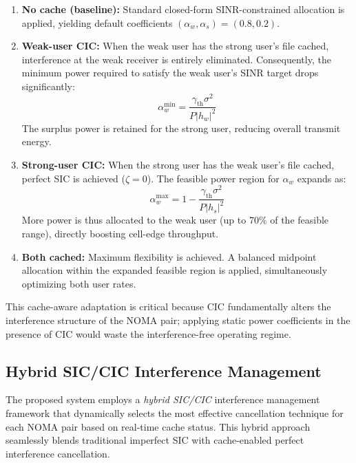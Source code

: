 \documentclass[conference]{IEEEtran}
\begin{document}
\begin{enumerate}
\item \textbf{No cache (baseline):} Standard closed-form SINR-constrained allocation is applied, yielding default coefficients $(\alpha_w, \alpha_s) = (0.8, 0.2)$.

\item \textbf{Weak-user CIC:} When the weak user has the strong user's file cached, interference at the weak receiver is entirely eliminated. Consequently, the minimum power required to satisfy the weak user's SINR target drops significantly:
\begin{equation}
\alpha_w^{\min} = \frac{\gamma_{\text{th}} \sigma^2}{P |h_w|^2}
\label{eq:pw_cic}
\end{equation}
The surplus power is retained for the strong user, reducing overall transmit energy.

\item \textbf{Strong-user CIC:} When the strong user has the weak user's file cached, perfect SIC is achieved ($\zeta = 0$). The feasible power region for $\alpha_w$ expands as:
\begin{equation}
\alpha_w^{\max} = 1 - \frac{\gamma_{\text{th}} \sigma^2}{P |h_s|^2}
\label{eq:pw_psic}
\end{equation}
More power is thus allocated to the weak user (up to 70\% of the feasible range), directly boosting cell-edge throughput.

\item \textbf{Both cached:} Maximum flexibility is achieved. A balanced midpoint allocation within the expanded feasible region is applied, simultaneously optimizing both user rates.
\end{enumerate}

This cache-aware adaptation is critical because CIC fundamentally alters the interference structure of the NOMA pair; applying static power coefficients in the presence of CIC would waste the interference-free operating regime.

\subsection{Hybrid SIC/CIC Interference Management}
The proposed system employs a \textit{hybrid SIC/CIC} interference management framework that dynamically selects the most effective cancellation technique for each NOMA pair based on real-time cache status. This hybrid approach seamlessly blends traditional imperfect SIC with cache-enabled perfect interference cancellation.
\end{document}
